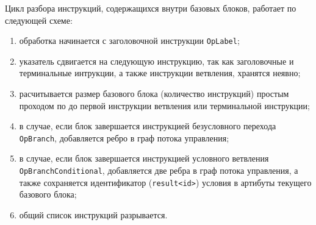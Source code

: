 \documentclass[14pt]{extarticle}
\begin{document}
Цикл разбора инструкций, содержащихся внутри базовых блоков, работает по следующей схеме:
\begin{enumerate}
	\item обработка начинается с заголовочной инструкции \texttt{OpLabel};
	
	\item указатель сдвигается на следующую инструкцию, так как заголовочные и терминальные интрукции, а также инструкции ветвления, хранятся неявно;
	
	\item расчитывается размер базового блока (количество инструкций) простым проходом по до первой инструкции ветвления или терминальной инструкции;
	
	\item в случае, если блок завершается инструкцией безусловного перехода \texttt{OpBranch}, добавляется ребро в граф потока управления;
	
	\item в случае, если блок завершается инструкцией условного ветвления\\
	\texttt{OpBranchConditional}, добавляется две ребра в граф потока управления, а также сохраняется идентификатор (\texttt{result<id>}) условия в артибуты текущего базового блока;
	
	\item общий список инструкций разрывается.
\end{enumerate}
\end{document}
